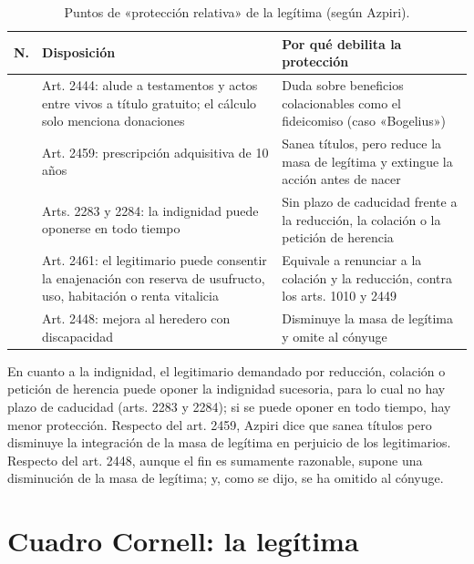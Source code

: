 \documentclass[12pt,oneside]{book}
\begin{document}
\begin{table}[H]
\centering
\small
\begin{tabularx}{\textwidth}{
    >{\centering\arraybackslash}p{0.9cm}
    >{\raggedright\arraybackslash}X
    >{\raggedright\arraybackslash}X
}
\toprule
\textbf{N.\textordmasculine{}} & \textbf{Disposición} & \textbf{Por qué debilita la protección} \\
\midrule
1 & Art. 2444: alude a testamentos y actos entre vivos a título gratuito; el cálculo solo menciona donaciones & Duda sobre beneficios colacionables como el fideicomiso (caso «Bogelius») \\
\addlinespace
2 & Art. 2459: prescripción adquisitiva de 10 años & Sanea títulos, pero reduce la masa de legítima y extingue la acción antes de nacer \\
\addlinespace
3 & Arts. 2283 y 2284: la indignidad puede oponerse en todo tiempo & Sin plazo de caducidad frente a la reducción, la colación o la petición de herencia \\
\addlinespace
4 & Art. 2461: el legitimario puede consentir la enajenación con reserva de usufructo, uso, habitación o renta vitalicia & Equivale a renunciar a la colación y la reducción, contra los arts. 1010 y 2449 \\
\addlinespace
5 & Art. 2448: mejora al heredero con discapacidad & Disminuye la masa de legítima y omite al cónyuge \\
\bottomrule
\end{tabularx}
\caption*{Puntos de «protección relativa» de la legítima (según Azpiri).}
\end{table}

En cuanto a la indignidad, el legitimario demandado por reducción, colación o petición de herencia puede oponer la indignidad sucesoria, para lo cual no hay plazo de caducidad (arts. 2283 y 2284); si se puede oponer en todo tiempo, hay menor protección. Respecto del art. 2459, Azpiri dice que sanea títulos pero disminuye la integración de la masa de legítima en perjuicio de los legitimarios. Respecto del art. 2448, aunque el fin es sumamente razonable, supone una disminución de la masa de legítima; y, como se dijo, se ha omitido al cónyuge.

\section{Cuadro Cornell: la legítima}
\end{document}
